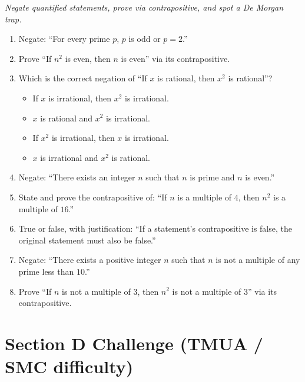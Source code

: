 \documentclass[11pt,a4paper]{article}
\begin{document}
\noindent\textit{Negate quantified statements, prove via contrapositive, and spot a De Morgan trap.}

\begin{enumerate}

\item Negate: ``For every prime $p$, $p$ is odd or $p=2$.''

\item Prove ``If $n^2$ is even, then $n$ is even'' via its contrapositive.

\item Which is the correct negation of ``If $x$ is rational, then $x^2$ is rational''?
\begin{itemize}
\item[A)] If $x$ is irrational, then $x^2$ is irrational.
\item[B)] $x$ is rational and $x^2$ is irrational.
\item[C)] If $x^2$ is irrational, then $x$ is irrational.
\item[D)] $x$ is irrational and $x^2$ is rational.
\end{itemize}

\item Negate: ``There exists an integer $n$ such that $n$ is prime and $n$ is even.''

\item State and prove the contrapositive of: ``If $n$ is a multiple of $4$, then $n^2$ is a multiple of $16$.''

\item True or false, with justification: ``If a statement's contrapositive is false, the original statement must also be false.''

\item Negate: ``There exists a positive integer $n$ such that $n$ is not a multiple of any prime less than $10$.''

\item Prove ``If $n$ is not a multiple of $3$, then $n^2$ is not a multiple of $3$'' via its contrapositive.

\end{enumerate}

\section*{Section D \quad Challenge \hfill{\normalfont\small(TMUA / SMC difficulty)}}
\end{document}
